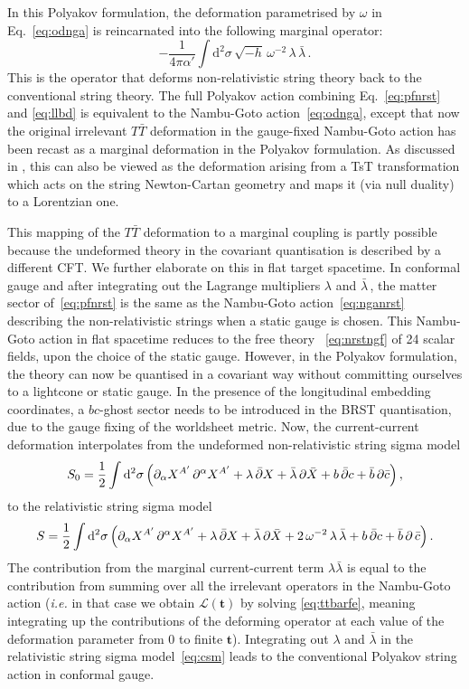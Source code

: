 \documentclass[11pt]{article}
\newcommand{\be}{\begin{equation}}
\newcommand{\ee}{\end{equation}}
\newcommand{\p}{\partial}
\renewcommand{\emph}[1]{\textit{#1}}
\newcommand{\dd}{\mathrm{d}}
\newcommand{\lambdap}{\boldsymbol{t}}
\begin{document}
In this Polyakov formulation, the deformation parametrised by $\omega$ in Eq.~\eqref{eq:odnga} is reincarnated into the following marginal operator:
%
\be \label{eq:llbd}
    - \frac{1}{4\pi\alpha'} \int \dd^2 \sigma \, \sqrt{-h} \, \omega^{-2} \, \lambda \, \bar{\lambda}\,. 
\ee
%
This is the operator that deforms non-relativistic string theory back to the conventional string theory.  The full Polyakov action combining Eq.~\eqref{eq:pfnrst} and \eqref{eq:llbd} is equivalent to the Nambu-Goto action~\eqref{eq:odnga}, except that now the original irrelevant $T\bar{T}$ deformation in the gauge-fixed Nambu-Goto action has been recast as a marginal deformation in the Polyakov formulation. 
As discussed in \cite{Blair:2020ops}, this can also be viewed as the deformation arising from a TsT transformation which acts on the string Newton-Cartan geometry and maps it (via null duality) to a Lorentzian one.

This mapping of the $T\bar{T}$ deformation to a marginal coupling is partly possible because the undeformed theory in the covariant quantisation is described by a different CFT. We further elaborate on this in flat target spacetime. In conformal gauge and after integrating out the Lagrange multipliers $\lambda$ and $\bar{\lambda}$\,, the matter sector of~\eqref{eq:pfnrst} is the same as the Nambu-Goto action~\eqref{eq:nganrst} describing the non-relativistic strings when a static gauge is chosen. This Nambu-Goto action in flat spacetime reduces to the free theory ~\eqref{eq:nrstngf} of 24 scalar fields, upon the choice of the static gauge. However, in the Polyakov formulation, the theory can now be quantised in a covariant way without committing ourselves to a lightcone or static gauge. In the presence of the longitudinal embedding coordinates, a $bc$-ghost sector needs to be introduced in the BRST quantisation, due to the gauge fixing of the worldsheet metric. Now, the current-current deformation interpolates from the undeformed non-relativistic string sigma model
%
\be
    S_0 = \frac{1}{2} \int \dd^2\sigma \, \Bigl( \p_\alpha X^{A'} \, \p^\alpha X^{A'} + \lambda \, \bar{\p} X + \bar{\lambda} \, \p \bar{X} + b \, \bar{\p} c + \bar{b} \, \p \bar{c} \Bigr)\,, 
\ee
%
to the relativistic string sigma model
%
\begin{align} \label{eq:csm}
    S = \frac{1}{2} \int \dd^2\sigma \, \Bigl( \p_\alpha X^{A'} \, \p^\alpha X^{A'} + \lambda \, \bar{\p} X + \bar{\lambda} \, \p \bar{X} + 2 \, \omega^{-2} \, \lambda \, \bar{\lambda} + b \, \bar{\p} c + \bar{b} \, \p \, \bar{c} \Bigr)\,.
\end{align}
%
The contribution from the marginal current-current term $\lambda\bar{\lambda}$ is equal to the contribution from summing over all the irrelevant operators
in the Nambu-Goto action (\emph{i.e.} in that case we obtain $\mathcal{L}(\lambdap)$ by solving \eqref{eq:ttbarfe}, meaning integrating up the contributions of the deforming operator at each value of the deformation parameter from $0$ to finite $\lambdap$).
Integrating out $\lambda$ and $\bar{\lambda}$ in the relativistic string sigma model~\eqref{eq:csm} leads to the conventional Polyakov string action in conformal gauge.
\end{document}
